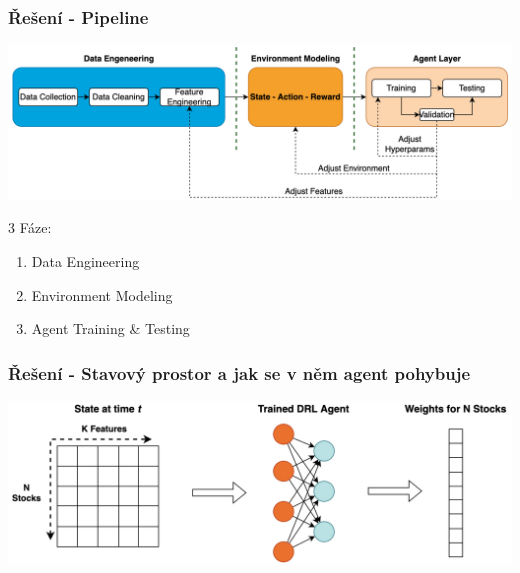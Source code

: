 \begin{frame}
    \frametitle{Řešení - Pipeline}

    \begin{center}
        \centering
        \includegraphics[width=\textwidth]{img/navrh_reseni}
    \end{center}
    {\Large 3 Fáze:}
    \begin{enumerate}
        \item Data Engineering
        \item Environment Modeling
        \item Agent Training \& Testing
    \end{enumerate}
\end{frame}

\begin{frame}
    \frametitle{Řešení - Stavový prostor a jak se v něm agent pohybuje}

    \begin{center}
        \centering
        \includegraphics[width=\textwidth]{img/env}
    \end{center}
\end{frame}



